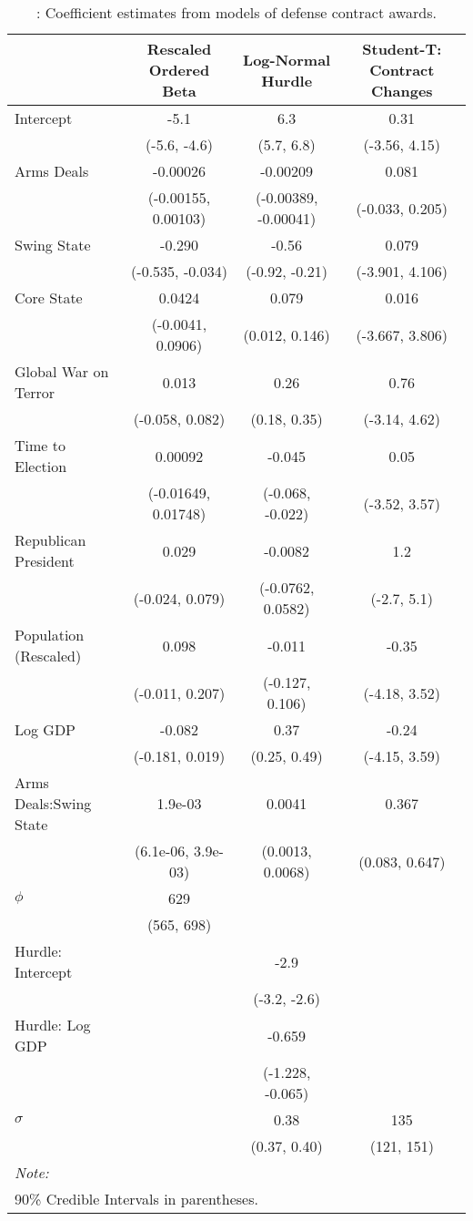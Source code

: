 \begingroup\fontsize{8}{10}\selectfont

\begin{longtable}[t]{lccc}
\caption{\label{tab:cont-regs}: Coefficient estimates from models of defense contract awards.}\\
\toprule
  & Rescaled Ordered Beta & Log-Normal Hurdle & Student-T: Contract Changes\\
\midrule
Intercept & -5.1 & 6.3 & 0.31\\
 & (-5.6, -4.6) & (5.7, 6.8) & (-3.56, 4.15)\\
Arms Deals & -0.00026 & -0.00209 & 0.081\\
 & (-0.00155, 0.00103) & (-0.00389, -0.00041) & (-0.033, 0.205)\\
Swing State & -0.290 & -0.56 & 0.079\\
 & (-0.535, -0.034) & (-0.92, -0.21) & (-3.901, 4.106)\\
Core State & 0.0424 & 0.079 & 0.016\\
 & (-0.0041, 0.0906) & (0.012, 0.146) & (-3.667, 3.806)\\
Global War on Terror & 0.013 & 0.26 & 0.76\\
 & (-0.058, 0.082) & (0.18, 0.35) & (-3.14, 4.62)\\
Time to Election & 0.00092 & -0.045 & 0.05\\
 & (-0.01649, 0.01748) & (-0.068, -0.022) & (-3.52, 3.57)\\
Republican President & 0.029 & -0.0082 & 1.2\\
 & (-0.024, 0.079) & (-0.0762, 0.0582) & (-2.7, 5.1)\\
Population (Rescaled) & 0.098 & -0.011 & -0.35\\
 & (-0.011, 0.207) & (-0.127, 0.106) & (-4.18, 3.52)\\
Log GDP & -0.082 & 0.37 & -0.24\\
 & (-0.181, 0.019) & (0.25, 0.49) & (-4.15, 3.59)\\
Arms Deals:Swing State & 1.9e-03 & 0.0041 & 0.367\\
 & (6.1e-06, 3.9e-03) & (0.0013, 0.0068) & (0.083, 0.647)\\
$\phi$ & 629 &  & \\
 & (565, 698) &  & \\
Hurdle: Intercept &  & -2.9 & \\
 &  & (-3.2, -2.6) & \\
Hurdle: Log GDP &  & -0.659 & \\
 &  & (-1.228, -0.065) & \\
$\sigma$ &  & 0.38 & 135\\
 &  & (0.37, 0.40) & (121, 151)\\
\bottomrule
\multicolumn{4}{l}{\rule{0pt}{1em}\textit{Note: }}\\
\multicolumn{4}{l}{\rule{0pt}{1em}90\% Credible Intervals in parentheses.}\\
\end{longtable}
\endgroup{}
